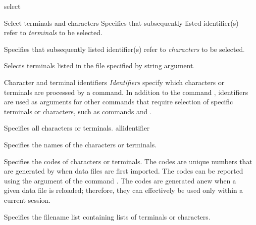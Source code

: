 \begin{command}{select}{}
\begin{arguments}
\begin{argumentgroup}{Select terminals and characters}
                {Specifies that subsequently listed identifier(s)
                refer to \emph{terminals} to be selected.} 
                {}

                {Specifies that subsequently listed identifier(s)
                refer to \emph{characters} to be selected.}
                {}

                {Selects terminals listed in the file specified by string argument.}
                {}

		\end{argumentgroup}
		
        \begin{argumentgroup}{Character and terminal identifiers}\label{identifiers}
        {\emph{Identifiers} specify which characters or terminals are processed by a command.
        In addition to the command , identifiers are used as
        arguments for other commands that require selection of specific terminals or
        characters, such as commands  and
        .}

                {Specifies all characters or terminals.}
                {allidentifier}

                {Specifies the names of the characters or terminals.}
                {}

                {Specifies the codes of characters or terminals. The codes are unique
                numbers that are generated by \poy when data files are first imported.
                The codes can be reported using the argument 
                of the command . The codes are generated anew
                when a given data file is reloaded; therefore, they can effectively be used
                only within a current \poy session.}
                {}

                {Specifies the filename list containing lists of terminals or
                characters.}
                {}


\end{argumentgroup}
\end{arguments}
\end{command}
